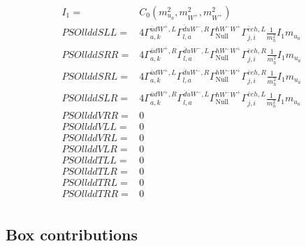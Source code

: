 \documentclass[A4,landscape]{article}
\begin{document}
\begin{align} 
I_1= & C_0(m^2_{u_{{a}}}, m^2_{W^+}, m^2_{W^+}) \\ 
  PSOllddSLL= & 4  \Gamma^{\bar{u}d W^+ ,L}_{a, k} \Gamma^{\bar{d}u W^-,R}_{l, a} \Gamma^{h W^-W^+ }_\text{Null} \Gamma^{\bar{e}e h ,L}_{j, i} \frac{1}{m^2_{h}} I_1 m_{u_{{a}}} \\ 
  PSOllddSRR= & 4  \Gamma^{\bar{u}d W^+ ,R}_{a, k} \Gamma^{\bar{d}u W^-,L}_{l, a} \Gamma^{h W^-W^+ }_\text{Null} \Gamma^{\bar{e}e h ,R}_{j, i} \frac{1}{m^2_{h}} I_1 m_{u_{{a}}} \\ 
  PSOllddSRL= & 4  \Gamma^{\bar{u}d W^+ ,L}_{a, k} \Gamma^{\bar{d}u W^-,R}_{l, a} \Gamma^{h W^-W^+ }_\text{Null} \Gamma^{\bar{e}e h ,R}_{j, i} \frac{1}{m^2_{h}} I_1 m_{u_{{a}}} \\ 
  PSOllddSLR= & 4  \Gamma^{\bar{u}d W^+ ,R}_{a, k} \Gamma^{\bar{d}u W^-,L}_{l, a} \Gamma^{h W^-W^+ }_\text{Null} \Gamma^{\bar{e}e h ,L}_{j, i} \frac{1}{m^2_{h}} I_1 m_{u_{{a}}} \\ 
  PSOllddVRR= & 0 \\ 
  PSOllddVLL= & 0 \\ 
  PSOllddVRL= & 0 \\ 
  PSOllddVLR= & 0 \\ 
  PSOllddTLL= & 0 \\ 
  PSOllddTLR= & 0 \\ 
  PSOllddTRL= & 0 \\ 
  PSOllddTRR= & 0 \\ 
\end{align} 
\subsection{Box contributions} 
\end{document}
